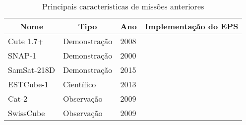 \begin{table}
\centering
\caption{Principais características de missões anteriores}
\label{history_table}
\begin{tabular}{|l|l|l|l|} 
\hline
\multicolumn{1}{|c|}{Nome} & \multicolumn{1}{c|}{Tipo} & \multicolumn{1}{c|}{Ano} & \multicolumn{1}{c|}{Implementação do EPS}  \\ 
\hline
Cute 1.7+                  & Demonstração              & 2008                     &                                            \\ 
\hline
SNAP-1                     & Demonstração              & 2000                     &                                            \\ 
\hline
SamSat-218D                & Demonstração              & 2015                     &                                            \\ 
\hline
ESTCube-1                  & Científico                & 2013                     &                                            \\ 
\hline
Cat-2                      & Observação                & 2009                     &                                            \\ 
\hline
SwissCube                  & Observação                & 2009                     &                                            \\
\hline
\end{tabular}
\end{table}